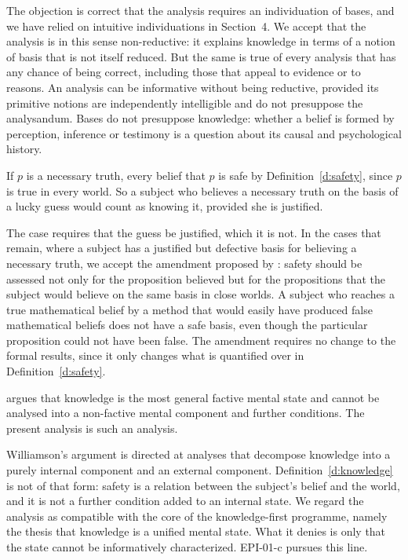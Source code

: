 \documentclass{situationist-preprint}
\begin{document}
\begin{reply}
The objection is correct that the analysis requires an individuation of bases, and we have relied on intuitive individuations in Section~4. We accept that the analysis is in this sense non-reductive: it explains knowledge in terms of a notion of basis that is not itself reduced. But the same is true of every analysis that has any chance of being correct, including those that appeal to evidence or to reasons. An analysis can be informative without being reductive, provided its primitive notions are independently intelligible and do not presuppose the analysandum. Bases do not presuppose knowledge: whether a belief is formed by perception, inference or testimony is a question about its causal and psychological history.
\end{reply}

\begin{objection}
If $p$ is a necessary truth, every belief that $p$ is safe by Definition~\ref{d:safety}, since $p$ is true in every world. So a subject who believes a necessary truth on the basis of a lucky guess would count as knowing it, provided she is justified.
\end{objection}

\begin{reply}
The case requires that the guess be justified, which it is not. In the cases that remain, where a subject has a justified but defective basis for believing a necessary truth, we accept the amendment proposed by \citet{Pritchard2005}: safety should be assessed not only for the proposition believed but for the propositions that the subject would believe on the same basis in close worlds. A subject who reaches a true mathematical belief by a method that would easily have produced false mathematical beliefs does not have a safe basis, even though the particular proposition could not have been false. The amendment requires no change to the formal results, since it only changes what is quantified over in Definition~\ref{d:safety}.
\end{reply}

\begin{objection}
\citet{Williamson2000} argues that knowledge is the most general factive mental state and cannot be analysed into a non-factive mental component and further conditions. The present analysis is such an analysis.
\end{objection}

\begin{reply}
Williamson's argument is directed at analyses that decompose knowledge into a purely internal component and an external component. Definition~\ref{d:knowledge} is not of that form: safety is a relation between the subject's belief and the world, and it is not a further condition added to an internal state. We regard the analysis as compatible with the core of the knowledge-first programme, namely the thesis that knowledge is a unified mental state. What it denies is only that the state cannot be informatively characterized. EPI-01-c pursues this line.
\end{reply}
\end{document}
